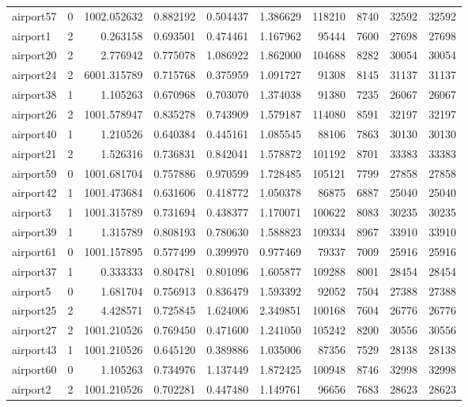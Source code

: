 \begin{longtable}{|l|r|r|r|r|r|r|r|r|r|}
airport57 & 0 & 1002.052632 & 0.882192 & 0.504437 & 1.386629 & 118210 & 8740 & 32592 & 32592 \\
airport1 & 2 & 0.263158 & 0.693501 & 0.474461 & 1.167962 & 95444 & 7600 & 27698 & 27698 \\
airport20 & 2 & 2.776942 & 0.775078 & 1.086922 & 1.862000 & 104688 & 8282 & 30054 & 30054 \\
airport24 & 2 & 6001.315789 & 0.715768 & 0.375959 & 1.091727 & 91308 & 8145 & 31137 & 31137 \\
airport38 & 1 & 1.105263 & 0.670968 & 0.703070 & 1.374038 & 91380 & 7235 & 26067 & 26067 \\
airport26 & 2 & 1001.578947 & 0.835278 & 0.743909 & 1.579187 & 114080 & 8591 & 32197 & 32197 \\
airport40 & 1 & 1.210526 & 0.640384 & 0.445161 & 1.085545 & 88106 & 7863 & 30130 & 30130 \\
airport21 & 2 & 1.526316 & 0.736831 & 0.842041 & 1.578872 & 101192 & 8701 & 33383 & 33383 \\
airport59 & 0 & 1001.681704 & 0.757886 & 0.970599 & 1.728485 & 105121 & 7799 & 27858 & 27858 \\
airport42 & 1 & 1001.473684 & 0.631606 & 0.418772 & 1.050378 & 86875 & 6887 & 25040 & 25040 \\
airport3 & 1 & 1001.315789 & 0.731694 & 0.438377 & 1.170071 & 100622 & 8083 & 30235 & 30235 \\
airport39 & 1 & 1.315789 & 0.808193 & 0.780630 & 1.588823 & 109334 & 8967 & 33910 & 33910 \\
airport61 & 0 & 1001.157895 & 0.577499 & 0.399970 & 0.977469 & 79337 & 7009 & 25916 & 25916 \\
airport37 & 1 & 0.333333 & 0.804781 & 0.801096 & 1.605877 & 109288 & 8001 & 28454 & 28454 \\
airport5 & 0 & 1.681704 & 0.756913 & 0.836479 & 1.593392 & 92052 & 7504 & 27388 & 27388 \\
airport25 & 2 & 4.428571 & 0.725845 & 1.624006 & 2.349851 & 100168 & 7604 & 26776 & 26776 \\
airport27 & 2 & 1001.210526 & 0.769450 & 0.471600 & 1.241050 & 105242 & 8200 & 30556 & 30556 \\
airport43 & 1 & 1001.210526 & 0.645120 & 0.389886 & 1.035006 & 87356 & 7529 & 28138 & 28138 \\
airport60 & 0 & 1.105263 & 0.734976 & 1.137449 & 1.872425 & 100948 & 8746 & 32998 & 32998 \\
airport2 & 2 & 1001.210526 & 0.702281 & 0.447480 & 1.149761 & 96656 & 7683 & 28623 & 28623 \\

\end{longtable}
